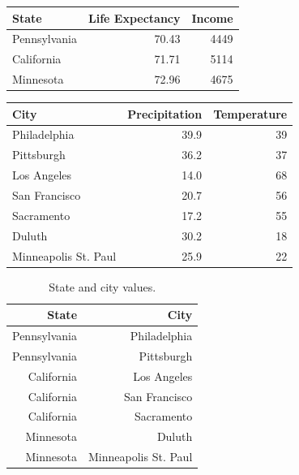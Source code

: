 \documentclass{article}[11pt]
\begin{document}
 

\small
\begin{tabular}[t]{ | l | r | r | }
  \hline
  State & Life Expectancy & Income \\ \hline
  Pennsylvania & 70.43 & 4449 \\ \hline
  California & 71.71 & 5114 \\ \hline
  Minnesota & 72.96 & 4675 \\ \hline
\end{tabular}
\hspace{10pt}
\begin{tabular}[t]{ | l | r | r | }
  \hline
  City & Precipitation & Temperature \\ \hline
  Philadelphia & 39.9 & 39 \\ \hline
  Pittsburgh & 36.2 & 37 \\ \hline
  Los Angeles & 14.0 & 68 \\ \hline
  San Francisco & 20.7 & 56 \\ \hline
  Sacramento & 17.2 & 55 \\ \hline
  Duluth & 30.2 & 18 \\ \hline
  Minneapolis St. Paul & 25.9 & 22 \\ \hline
\end{tabular}

\begin{table}[h]
  \begin{center}
    \begin{tabular}{ | r | r | }
      \hline
      State & City \\ \hline
      Pennsylvania & Philadelphia \\ \hline
      Pennsylvania & Pittsburgh \\ \hline
      California & Los Angeles \\ \hline
      California & San Francisco \\ \hline
      California & Sacramento \\ \hline
      Minnesota & Duluth \\ \hline
      Minnesota & Minneapolis St. Paul \\ \hline
    \end{tabular}
    \caption{State and city values.}\label{Tab:CityState}
  \end{center}
\end{table}
\end{document}
